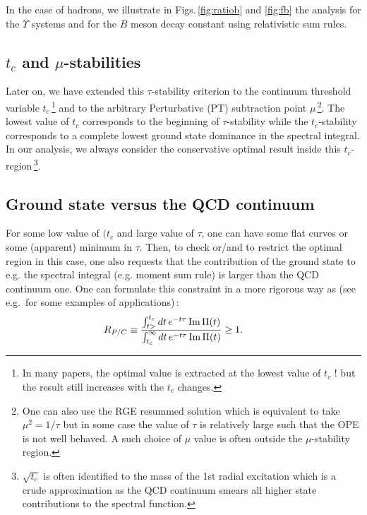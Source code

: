 \documentclass[aps,prd,groupedaddress,nofootinbib]{revtex4-1}
\def\beq{\begin{equation}}
\def\eeq{\end{equation}}
\begin{document}
In the case of hadrons, we illustrate in Figs.\,\ref{fig:ratiob} and \ref{fig:fb} the  analysis for the $\Upsilon$ systems and for the $B$ meson decay constant using relativistic  sum rules. 

\subsection{$t_c$ and $\mu$-stabilities}
Later on, we have extended this $\tau$-stability criterion to the continuum threshold variable $t_c$\,\footnote{In many papers, the optimal value is extracted at the lowest value of $t_c$ ! but the result still increases with the $t_c$ changes.  } and to the arbitrary Perturbative (PT) subtraction point $\mu$\,\footnote{One can also use the RGE resummed solution which is equivalent to take $\mu^2=1/\tau$ but in some case the value of $\tau$ is relatively large such that the OPE is not well behaved. A such choice of $\mu$ value is often outside the $\mu$-stability region.}. 
The lowest value of $ t_c$ corresponds to the beginning  of $\tau$-stability while the $t_c$-stability 
corresponds to a complete lowest ground state dominance in the spectral integral. In our analysis, we always consider the conservative optimal result inside this $t_c$-region\,\footnote{$\sqrt{t_c}$ is often identified to the mass of the 1st radial excitation which is a crude approximation as the QCD continuum smears all higher state contributions to the spectral function.}. 
\subsection{Ground state versus the QCD continuum}
For some low value of $(t_c$ and large value of $\tau$, one can have some flat curves or some (apparent) minimum in $\tau$. Then, to check or/and to restrict the optimal region in this case, one also  requests that the contribution of the ground state to e.g. the spectral integral (e.g. moment sum rule) is larger than the QCD continuum one. One can formulate this constraint in a more rigorous way as (see e.g.\,\cite{SNPC} for some examples of applications)\,:
\beq
\hspace*{-0.75cm}R_{P/C} \equiv\frac{\int_{t>}^{t_c}dt\,e^{-t\tau}{\,\rm Im}\,\Pi(t)}{\int_{t_c}^{\infty}dt\,e^{-t\tau}{\,\rm Im}\,\Pi(t)}\geq 1.
\eeq
\vspace*{-0.35cm}
\end{document}
